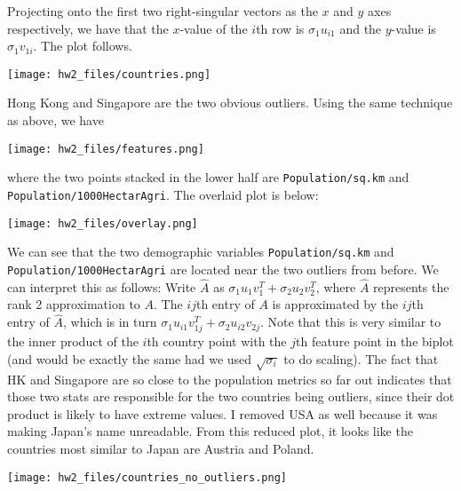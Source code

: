 \documentclass{article}
\begin{document}
Projecting onto the first two right-singular vectors as the $x$ and $y$ axes respectively, we have that the $x$-value of the $i$th row is $\sigma_1u_{i1}$ and the $y$-value is $\sigma_1v_{1i}$. The plot follows.

\texttt{[image: hw2\_files/countries.png]}

Hong Kong and Singapore are the two obvious outliers.
Using the same technique as above, we have

\texttt{[image: hw2\_files/features.png]}

where the two points stacked in the lower half are \verb|Population/sq.km| and \verb|Population/1000HectarAgri|.
The overlaid plot is below:

\texttt{[image: hw2\_files/overlay.png]}

We can see that the two demographic variables \verb|Population/sq.km| and \verb|Population/1000HectarAgri| are located near the two outliers from before. We can interpret this as follows: Write $\hat{A}$ as $\sigma_1u_1v_1^T+\sigma_2u_2v_2^T$, where $\hat{A}$ represents the rank 2 approximation to $A$. The $ij$th entry of $A$ is approximated by the $ij$th entry of $\hat{A}$, which is in turn $\sigma_1u_{i1}v_{1j}^T+\sigma_2u_{i2}v_{2j}$. Note that this is very similar to the inner product of the $i$th country point with the $j$th feature point in the biplot (and would be exactly the same had we used $\sqrt{\sigma_i}$ to do scaling). The fact that HK and Singapore are so close to the population metrics so far out indicates that those two stats are responsible for the two countries being outliers, since their dot product is likely to have extreme values.
I removed USA as well because it was making Japan's name unreadable. From this reduced plot, it looks like the countries most similar to Japan are Austria and Poland. 

\texttt{[image: hw2\_files/countries\_no\_outliers.png]}
\end{document}
